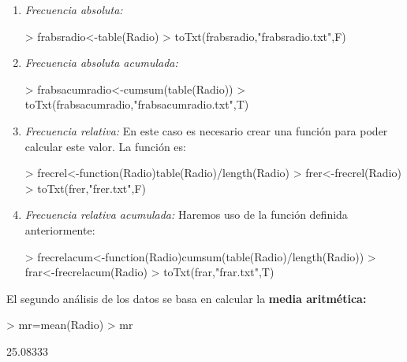 \documentclass [a4paper] {article}
\begin{document}
\begin{enumerate}
\item
\textit{Frecuencia absoluta: }
\begin{Schunk}
\begin{Sinput}
> frabsradio<-table(Radio)
> toTxt(frabsradio,"frabsradio.txt",F)
\end{Sinput}
\end{Schunk}

\item
\textit{Frecuencia absoluta acumulada: }
\begin{Schunk}
\begin{Sinput}
> frabsacumradio<-cumsum(table(Radio))
> toTxt(frabsacumradio,"frabsacumradio.txt",T)
\end{Sinput}
\end{Schunk}

\item
\textit{Frecuencia relativa: }En este caso es necesario crear una funci\'on
para poder calcular este valor. La funci\'on es:
\begin{Schunk}
\begin{Sinput}
> frecrel<-function(Radio){table(Radio)/length(Radio)}
> frer<-frecrel(Radio)
> toTxt(frer,"frer.txt",F)
\end{Sinput}
\end{Schunk}

\item
\textit{Frecuencia relativa acumulada: }Haremos uso de la funci\'on definida anteriormente:
\begin{Schunk}
\begin{Sinput}
> frecrelacum<-function(Radio){cumsum(table(Radio)/length(Radio))}
> frar<-frecrelacum(Radio)
> toTxt(frar,"frar.txt",T)
\end{Sinput}
\end{Schunk}
\end{enumerate}

\bigskip
El segundo an\'alisis de los datos se basa en calcular la \textbf{media aritm\'etica:}
\begin{Schunk}
\begin{Sinput}
> mr=mean(Radio)
> mr
\end{Sinput}
\begin{Soutput}
[1] 25.08333
\end{Soutput}
\end{Schunk}
\end{document}
